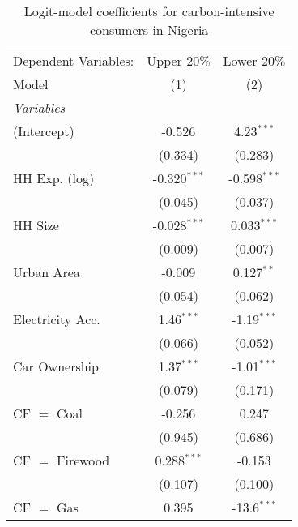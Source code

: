
\begin{table}[htbp!]
   \centering
   \small
   \begin{adjustbox}{width = 1\textwidth, max height = 0.95\textheight, center}
      \begin{threeparttable}[b]
         \caption{\label{tab:Logit_1_NGA} Logit-model coefficients for carbon-intensive consumers in Nigeria}
         \begin{tabular}{lcc}
            \tabularnewline \midrule \midrule
            Dependent Variables: & Upper 20\%     & Lower 20\%\\   
            Model                & (1)            & (2)\\  
            \midrule
            \emph{Variables}\\
            (Intercept)          & -0.526         & 4.23$^{***}$\\   
                                 & (0.334)        & (0.283)\\   
            HH Exp. (log)        & -0.320$^{***}$ & -0.598$^{***}$\\   
                                 & (0.045)        & (0.037)\\   
            HH Size              & -0.028$^{***}$ & 0.033$^{***}$\\   
                                 & (0.009)        & (0.007)\\   
            Urban Area           & -0.009         & 0.127$^{**}$\\   
                                 & (0.054)        & (0.062)\\   
            Electricity Acc.     & 1.46$^{***}$   & -1.19$^{***}$\\   
                                 & (0.066)        & (0.052)\\   
            Car Ownership        & 1.37$^{***}$   & -1.01$^{***}$\\   
                                 & (0.079)        & (0.171)\\   
            CF $=$ Coal          & -0.256         & 0.247\\   
                                 & (0.945)        & (0.686)\\   
            CF $=$ Firewood      & 0.288$^{***}$  & -0.153\\   
                                 & (0.107)        & (0.100)\\   
            CF $=$ Gas           & 0.395          & -13.6$^{***}$\\   

\end{tabular}
\end{threeparttable}
\end{adjustbox}
\end{table}

